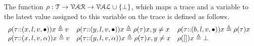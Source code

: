 The function $\rho : {\mathcal{T}}  \to \mathcal{VAR} \to \mathcal{VAL} \cup \{\bot\}$, which maps a trace and a variable to the latest value assigned to this variable on the trace is defined as follows.
\[
\begin{array}{lll}
\rho(\mathtt{\tau}  {\small ::} (x, l, v, \bullet)) x \triangleq v
&
\rho(\mathtt{\tau} {\small ::} (y, l, v, \bullet)) x \triangleq \rho(\mathtt{\tau}) x, y \neq x
&
\rho(\mathtt{\tau} {\small ::} (b, l, v, \bullet)) x \triangleq \rho(\mathtt{\tau}) x
\\
\rho(\mathtt{\tau} {\small ::} (x, l, v, \alpha)) x \triangleq v
&
\rho(\mathtt{\tau} {\small ::} (y, l, v, \alpha)) x \triangleq \rho(\mathtt{\tau}) x, y \neq x
&
\rho({[]} ) x \triangleq \bot
\end{array}
\]

